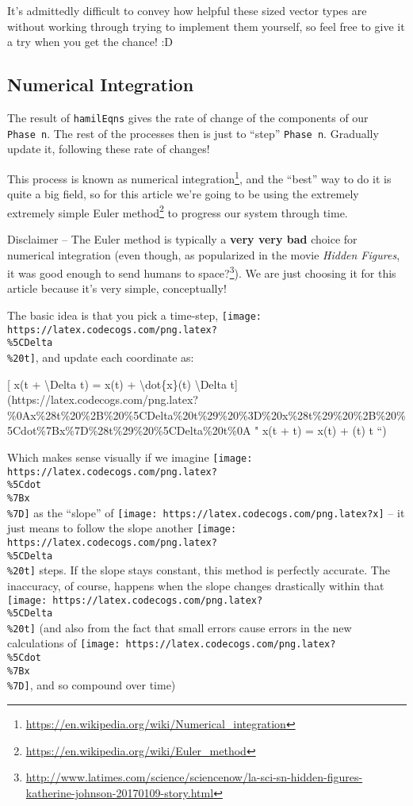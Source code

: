 \documentclass[]{article}
\renewcommand{\href}[2]{#2\footnote{\url{#1}}}
\begin{document}
It's admittedly difficult to convey how helpful these sized vector types are
without working through trying to implement them yourself, so feel free to give
it a try when you get the chance! :D

\subsection{Numerical Integration}\label{numerical-integration}

The result of \texttt{hamilEqns} gives the rate of change of the components of
our \texttt{Phase\ n}. The rest of the processes then is just to ``step''
\texttt{Phase\ n}. Gradually update it, following these rate of changes!

This process is known as
\href{https://en.wikipedia.org/wiki/Numerical_integration}{numerical
integration}, and the ``best'' way to do it is quite a big field, so for this
article we're going to be using the extremely extremely simple
\href{https://en.wikipedia.org/wiki/Euler_method}{Euler method} to progress our
system through time.

Disclaimer -- The Euler method is typically a \textbf{very very bad} choice for
numerical integration (even though, as popularized in the movie \emph{Hidden
Figures}, it was good enough to
\href{http://www.latimes.com/science/sciencenow/la-sci-sn-hidden-figures-katherine-johnson-20170109-story.html}{send
humans to space?}). We are just choosing it for this article because it's very
simple, conceptually!

The basic idea is that you pick a time-step,
\texttt{[image: https://latex.codecogs.com/png.latex?\\\%5CDelta\\\%20t]}, and
update each coordinate as:

{[} x(t + \textbackslash{}Delta t) = x(t) + \textbackslash{}dot\{x\}(t)
\textbackslash{}Delta
t{]}(https://latex.codecogs.com/png.latex?\%0Ax\%28t\%20\%2B\%20\%5CDelta\%20t\%29\%20\%3D\%20x\%28t\%29\%20\%2B\%20\%5Cdot\%7Bx\%7D\%28t\%29\%20\%5CDelta\%20t\%0A
" x(t + \Delta t) = x(t) + (t) \Delta t ``)

Which makes sense visually if we imagine
\texttt{[image: https://latex.codecogs.com/png.latex?\\\%5Cdot\\\%7Bx\\\%7D]} as the
``slope'' of \texttt{[image: https://latex.codecogs.com/png.latex?x]} -- it just
means to follow the slope another
\texttt{[image: https://latex.codecogs.com/png.latex?\\\%5CDelta\\\%20t]} steps. If
the slope stays constant, this method is perfectly accurate. The inaccuracy, of
course, happens when the slope changes drastically within that
\texttt{[image: https://latex.codecogs.com/png.latex?\\\%5CDelta\\\%20t]} (and also
from the fact that small errors cause errors in the new calculations of
\texttt{[image: https://latex.codecogs.com/png.latex?\\\%5Cdot\\\%7Bx\\\%7D]}, and so
compound over time)
\end{document}
